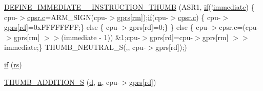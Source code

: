 \begin{DoxyCompactItemize}
\mbox{\hyperlink{isa-thumb_8c_ae8ac73497fb87da8a271abc2a991bf49}{D\+E\+F\+I\+N\+E\+\_\+\+I\+M\+M\+E\+D\+I\+A\+T\+E\+\_\+\_\+\+I\+N\+S\+T\+R\+U\+C\+T\+I\+O\+N\+\_\+\+T\+H\+U\+MB}} (A\+S\+R1, \mbox{\hyperlink{isa-lr35902_8c_a2eb27369cb3dbac14564f95cd51effdf}{if}}(!\mbox{\hyperlink{lr35902_2decoder_8c_a8bc2501cb64b3bc9ac59754cfafb68d1}{immediate}}) \{ cpu-\/$>$\mbox{\hyperlink{isa-lr35902_8c_ab27f9f98dd173bfc694f5d161e839d6e}{cpsr.\+c}}=A\+R\+M\+\_\+\+S\+I\+GN(cpu-\/$>$\mbox{\hyperlink{isa-thumb_8c_a6b4b7e13a9a144391615b217c5917bc7}{gprs}}\mbox{[}\mbox{\hyperlink{isa-thumb_8c_a20e40d2fb8c51fa4dd2b4449ad32e111}{rm}}\mbox{]});\mbox{\hyperlink{isa-lr35902_8c_a2eb27369cb3dbac14564f95cd51effdf}{if}}(cpu-\/$>$\mbox{\hyperlink{isa-lr35902_8c_ab27f9f98dd173bfc694f5d161e839d6e}{cpsr.\+c}}) \{ cpu-\/$>$\mbox{\hyperlink{isa-thumb_8c_a6b4b7e13a9a144391615b217c5917bc7}{gprs}}\mbox{[}\mbox{\hyperlink{isa-arm_8c_a555541ce18ed9b5fad657a06b22cb465}{rd}}\mbox{]}=0x\+F\+F\+F\+F\+F\+F\+F\+F;\} else \{ cpu-\/$>$gprs\mbox{[}rd\mbox{]}=0;\} \} else \{ cpu-\/$>$cpsr.\+c=(cpu-\/$>$gprs\mbox{[}rm\mbox{]} $>$$>$(immediate -\/ 1)) \&1;cpu-\/$>$gprs\mbox{[}rd\mbox{]}=cpu-\/$>$gprs\mbox{[}rm\mbox{]} $>$$>$ immediate;\} T\+H\+U\+M\+B\+\_\+\+N\+E\+U\+T\+R\+A\+L\+\_\+\+S(,, cpu-\/$>$gprs\mbox{[}rd\mbox{]});)
\item 
\mbox{\hyperlink{isa-thumb_8c_a2f69e657aa117d0aa42eec581e69a059}{if}} (\mbox{\hyperlink{isa-thumb_8c_a03b78d51ad860bbea2f9c98276d0b70b}{rs}})
\item 
\mbox{\hyperlink{isa-thumb_8c_a033bc2698df421a3e3f85f4f8211a20f}{T\+H\+U\+M\+B\+\_\+\+A\+D\+D\+I\+T\+I\+O\+N\+\_\+S}} (\mbox{\hyperlink{isa-thumb_8c_a6f364afbe132c4ecfea48bde1b0618ba}{d}}, \mbox{\hyperlink{isa-lr35902_8c_ae54e54065504090672c92ef62a1c5f05}{n}}, cpu-\/$>$\mbox{\hyperlink{isa-thumb_8c_a6b4b7e13a9a144391615b217c5917bc7}{gprs}}\mbox{[}\mbox{\hyperlink{isa-arm_8c_a555541ce18ed9b5fad657a06b22cb465}{rd}}\mbox{]})
\item 

\end{DoxyCompactItemize}

